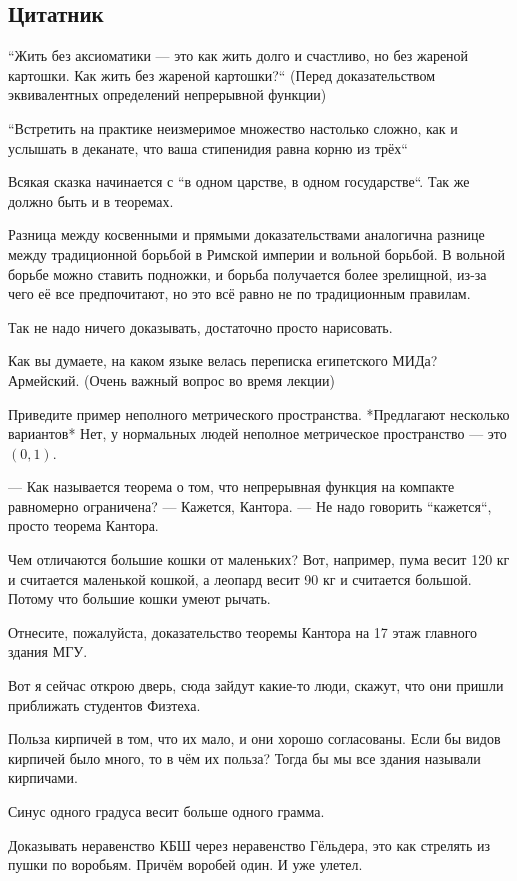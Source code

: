 \iffalse
\subsection{Цитатник}
``Жить без аксиоматики --- это как жить долго и счастливо, но без жареной картошки. Как жить без жареной картошки?`` (Перед доказательством эквивалентных определений непрерывной функции)

``Встретить на практике неизмеримое множество настолько сложно, как и услышать в деканате, что ваша стипенидия равна корню из трёх``

Всякая сказка начинается с ``в одном царстве, в одном государстве``. Так же должно быть и в теоремах.

Разница между косвенными и прямыми доказательствами аналогична разнице между традиционной борьбой в Римской империи и вольной борьбой.
В вольной борьбе можно ставить подножки, и борьба получается более зрелищной, из-за чего её все предпочитают, но это всё равно не по традиционным правилам.

Так не надо ничего доказывать, достаточно просто нарисовать.

Как вы думаете, на каком языке велась переписка египетского МИДа?
Армейский. (Очень важный вопрос во время лекции)

Приведите пример неполного метрического пространства.
*Предлагают несколько вариантов*
Нет, у нормальных людей неполное метрическое пространство --- это $(0, 1)$.

--- Как называется теорема о том, что непрерывная функция на компакте равномерно ограничена?
--- Кажется, Кантора.
--- Не надо говорить ``кажется``, просто теорема Кантора.

Чем отличаются большие кошки от маленьких? Вот, например, пума весит 120 кг и считается маленькой кошкой, а леопард весит 90 кг и считается большой.
Потому что большие кошки умеют рычать.

Отнесите, пожалуйста, доказательство теоремы Кантора на 17 этаж главного здания МГУ.

Вот я сейчас открою дверь, сюда зайдут какие-то люди, скажут, что они пришли приближать студентов Физтеха.

Польза кирпичей в том, что их мало, и они хорошо согласованы.
Если бы видов кирпичей было много, то в чём их польза?
Тогда бы мы все здания называли кирпичами.

Синус одного градуса весит больше одного грамма.

Доказывать неравенство КБШ через неравенство Гёльдера, это как стрелять из пушки по воробьям. Причём воробей один. И уже улетел.

